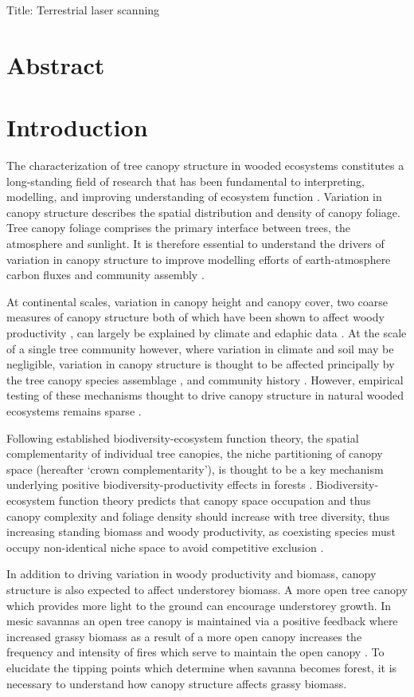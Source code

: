 \documentclass[11pt,a4paper]{article}
\newcommand{\titletext}{Terrestrial laser scanning}
\begin{document}
{\Large{Title: \titletext{}}}


\section*{Abstract}

\section{Introduction}

The characterization of tree canopy structure in wooded ecosystems constitutes a long-standing field of research that has been fundamental to interpreting, modelling, and improving understanding of ecosystem function \citep{Watt1947, WhittakerWoodwell1969, Horn1971}. Variation in canopy structure describes the spatial distribution and density of canopy foliage. Tree canopy foliage comprises the primary interface between trees, the atmosphere and sunlight. It is therefore essential to understand the drivers of variation in canopy structure to improve modelling efforts of earth-atmosphere carbon fluxes and community assembly \citep{}. 

At continental scales, variation in canopy height and canopy cover, two coarse measures of canopy structure both of which have been shown to affect woody productivity \citep{}, can largely be explained by climate and edaphic data \citep{SOME-GEDI}. At the scale of a single tree community however, where variation in climate and soil may be negligible, variation in canopy structure is thought to be affected principally by the tree canopy species assemblage \citep{}, and community history \citep{}. However, empirical testing of these mechanisms thought to drive canopy structure in natural wooded ecosystems remains sparse \citep{}.

Following established biodiversity-ecosystem function theory, the spatial complementarity of individual tree canopies, the niche partitioning of canopy space (hereafter `crown complementarity'), is thought to be a key mechanism underlying positive biodiversity-productivity effects in forests \citep{Pretzsch2014, Barry2019}. Biodiversity-ecosystem function theory predicts that canopy space occupation and thus canopy complexity and foliage density should increase with tree diversity, thus increasing standing biomass and woody productivity, as coexisting species must occupy non-identical niche space to avoid competitive exclusion \citep{}. 

In addition to driving variation in woody productivity and biomass, canopy structure is also expected to affect understorey biomass. A more open tree canopy which provides more light to the ground can encourage understorey growth. In mesic savannas an open tree canopy is maintained via a positive feedback where increased grassy biomass as a result of a more open canopy increases the frequency and intensity of fires which serve to maintain the open canopy \citep{}. To elucidate the tipping points which determine when savanna becomes forest, it is necessary to understand how canopy structure affects grassy biomass.
\end{document}
